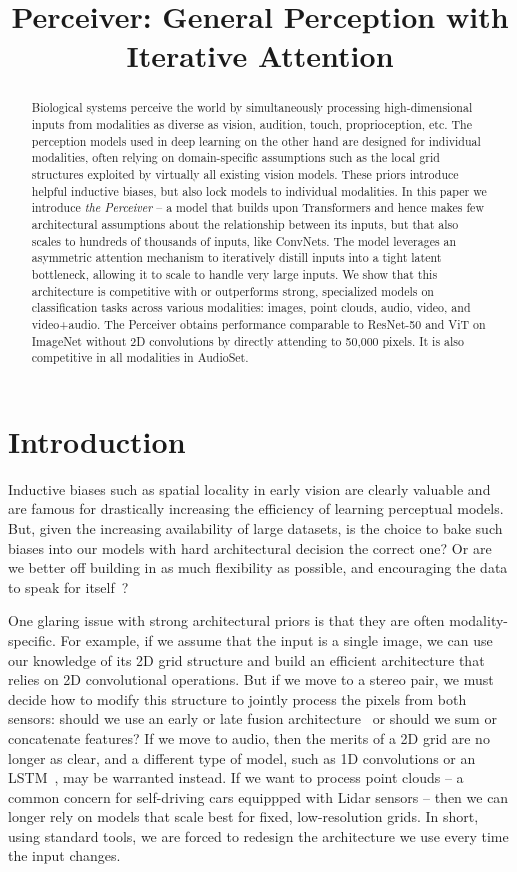 \title{Perceiver: General Perception with Iterative Attention}

\begin{abstract}
Biological systems perceive the world by simultaneously processing high-dimensional inputs from modalities as diverse as vision, audition, touch, proprioception, etc. The perception models used in deep learning on the other hand are designed for individual modalities, often relying on domain-specific assumptions such as the local grid structures exploited by virtually all existing vision models. These priors introduce helpful inductive biases, but also lock models to individual modalities. In this paper we introduce \textit{the Perceiver} -- a model that builds upon Transformers and hence makes few architectural assumptions about the relationship between its inputs, but that also scales to hundreds of thousands of inputs, like ConvNets. The model  leverages an asymmetric attention mechanism to iteratively distill inputs into a tight latent bottleneck, allowing it to scale to handle very large inputs. We show that this architecture is competitive with or outperforms strong, specialized models on classification tasks across various modalities: images, point clouds, audio, video, and video+audio. The Perceiver obtains performance comparable to ResNet-50 and ViT on ImageNet without 2D convolutions by directly attending to 50,000 pixels. It is also competitive in all modalities in AudioSet.
\end{abstract}

\section{Introduction}
\label{submission}

Inductive biases such as spatial locality in early vision are clearly valuable and are famous for drastically increasing the efficiency of learning perceptual models. But, given the increasing availability of large datasets, is the choice to bake such biases into our models with hard architectural decision the correct one? Or are we better off building in as much flexibility as possible, and encouraging the data to speak for itself~\cite{lecun2015deep}?

One glaring issue with strong architectural priors is that they are often modality-specific. For example, if we assume that the input is a single image, we can use our knowledge of its 2D grid structure and build an efficient architecture that relies on 2D convolutional operations. But if we move to a stereo pair, we must decide how to modify this structure to jointly process the pixels from both sensors: should we use an early or late fusion architecture~\cite{karpathy2014largescale} or should we sum or concatenate features? If we move to audio, then the merits of a 2D grid are no longer as clear, and a different type of model, such as 1D convolutions or an LSTM~\cite{hochreiter1997long,6638947}, may be warranted instead. If we want to process point clouds -- a common concern for self-driving cars equippped with Lidar sensors -- then we can longer rely on models that scale best for fixed, low-resolution grids. In short, using standard tools, we are forced to redesign the architecture we use every time the input changes.

